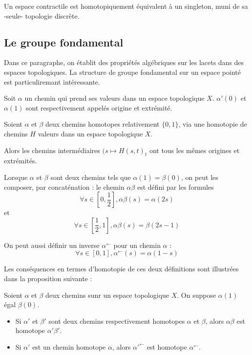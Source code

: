 \begin{prop}
Un espace contractile est homotopiquement \'equivalent \`a un singleton, muni de sa -seule- topologie discr\`ete.
\end{prop}

\subsection{Le groupe fondamental}

Dans ce paragraphe, on \'etablit des propri\'et\'es alg\'ebriques sur les lacets dans des espaces topologiques. La structure de groupe fondamental sur un espace point\'e est particuliremant int\'eressante.

\begin{defi}
Soit $\alpha$ un chemin qui prend ses valeurs dans un espace topologique $X$. $\alpha '(0)$ et $\alpha (1)$ sont respectivement appel\'es origine et extr\'emit\'e.
\end{defi}

\begin{exem}
Soient $\alpha$ et $\beta$ deux chemins homotopes relativement  $\{0,1\}$, via une homotopie de chemins $H$  valeurs dans un espace topologique $X$.

\par
Alors les chemins interm\'ediaires $(s\mapsto H(s,t)_t$ ont tous les m\^emes origines et extr\'emit\'es.
\end{exem}

Lorsque $\alpha$ et $\beta$ sont deux chemins tels que $\alpha (1)=\beta (0)$, on peut les composer, par concat\'enation : le chemin $\alpha \beta$ est d\'efini par les formules
\[\forall s\in \left[0,\frac{1}{2}\right] , \alpha \beta (s) = \alpha (2s)\]%
et
\[\forall s \in \left[\frac{1}{2} , 1\right] , \alpha \beta (s) = \beta (2s-1)\]

On peut aussi d\'efinir un inverse $\alpha^{\leftarrow}$ pour un chemin $\alpha$ :
\[\forall s \in [0,1] , \alpha^{\leftarrow} (s) = \alpha (1-s)\]

Les cons\'equences en termes d'homotopie de ces deux d\'efinitions sont illustr\'ees dans la proposition suivante :

\begin{prop}
Soient $\alpha$ et $\beta$ deux chemins sunr un espace topologique $X$. On suppose $\alpha (1)$ \'egal  $\beta (0)$.
\begin{itemize}
\item Si $\alpha '$ et $\beta '$ sont deux chemins %
respectivement homotopes $\alpha$ et $\beta$, alors $\alpha \beta$ est homotope  $\alpha '\beta '$.
\item Si $\alpha '$ est un chemin homotope  $\alpha$, alors $\alpha '^{\leftarrow}$ est homotope  $\alpha^{\leftarrow}$.
\end{itemize}
\end{prop}

